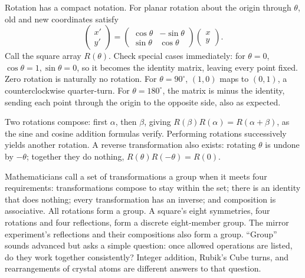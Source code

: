 \begin{mathbridge}
Rotation has a compact notation. For planar rotation about the origin through \(\theta\), old and new coordinates satisfy
\[
\begin{pmatrix} x' \\ y' \end{pmatrix}
=
\begin{pmatrix} \cos\theta & -\sin\theta \\ \sin\theta & \cos\theta \end{pmatrix}
\begin{pmatrix} x \\ y \end{pmatrix}.
\]
Call the square array \(R(\theta)\). Check special cases immediately: for \(\theta=0\), \(\cos\theta=1,\sin\theta=0\), so it becomes the identity matrix, leaving every point fixed. Zero rotation is naturally no rotation. For \(\theta=90^\circ\), \((1,0)\) maps to \((0,1)\), a counterclockwise quarter-turn. For \(\theta=180^\circ\), the matrix is minus the identity, sending each point through the origin to the opposite side, also as expected.

Two rotations compose: first \(\alpha\), then \(\beta\), giving \(R(\beta)R(\alpha)=R(\alpha+\beta)\), as the sine and cosine addition formulas verify. Performing rotations successively yields another rotation. A reverse transformation also exists: rotating \(\theta\) is undone by \(-\theta\); together they do nothing, \(R(\theta)R(-\theta)=R(0)\).

Mathematicians call a set of transformations a group when it meets four requirements: transformations compose to stay within the set; there is an identity that does nothing; every transformation has an inverse; and composition is associative. All rotations form a group. A square's eight symmetries, four rotations and four reflections, form a discrete eight-member group. The mirror experiment's reflections and their compositions also form a group. ``Group'' sounds advanced but asks a simple question: once allowed operations are listed, do they work together consistently? Integer addition, Rubik's Cube turns, and rearrangements of crystal atoms are different answers to that question.
\end{mathbridge}

